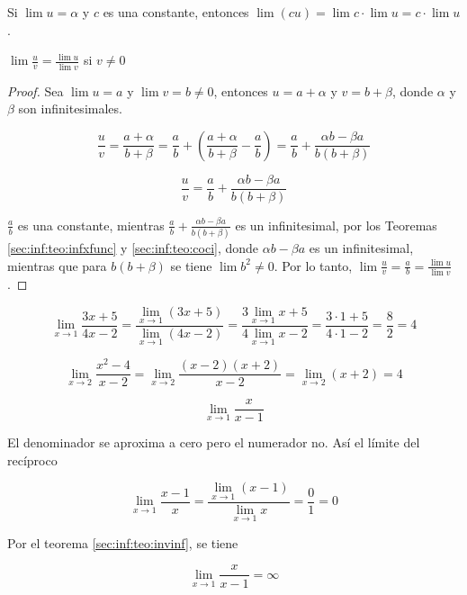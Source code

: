 \begin{corollary}
  Si $\lim u = \alpha$ y $c$ es una constante, entonces $\lim (cu) = \lim c \cdot \lim u = c \cdot \lim u$.
\end{corollary}


\begin{theorem}
  $\lim \frac {u}{v} = \frac {\lim u} {\lim v}$ si $v \ne 0$
\end{theorem}

\begin{proof}
  Sea $\lim u = a$ y $\lim v = b \ne 0$, entonces $u = a + \alpha$ y $v = b + \beta$, donde $\alpha$ y $\beta$ son infinitesimales.

  $$\frac{u}{v} = \frac {a + \alpha} {b + \beta} = \frac {a} {b} + \left( \frac {a + \alpha} {b + \beta} - \frac {a} {b} \right) = \frac {a} {b} + \frac {\alpha b - \beta a} {b (b + \beta)}$$

  $$\frac{u}{v} = \frac {a} {b} + \frac {\alpha b - \beta a} {b (b + \beta)}$$

  $\frac {a} {b}$ es una constante, mientras $\frac {a} {b} + \frac {\alpha b - \beta a} {b (b + \beta)}$ es un infinitesimal, por los Teoremas \ref{sec:inf:teo:infxfunc} y \ref{sec:inf:teo:coci}, donde $\alpha b - \beta a$ es un infinitesimal, mientras que para $b (b + \beta)$ se tiene $\lim b^2 \ne 0$. Por lo tanto, $\lim \frac{u} {v} = \frac {a} {b} = \frac {\lim u} {\lim v}$.
\end{proof}


\begin{example}
  \[ \lim_{x \to 1} \frac {3x + 5} {4x - 2} = \frac {\lim_{x \to 1} (3x + 5)} {\lim_{x \to 1} (4x - 2)} = \frac {3 \lim_{x \to 1} x + 5} {4 \lim_{x \to 1} x - 2} = \frac {3 \cdot 1 + 5} {4 \cdot 1 - 2} = \frac {8} {2} = 4\]
\end{example}


\begin{example}
  \[ \lim_{x \to 2} \frac {x^2 - 4} {x - 2} = \lim_{x \to 2} \frac {(x - 2) (x + 2)} {x - 2} = \lim_{x \to 2} (x + 2) = 4 \]
\end{example}


\begin{example}
  \[ \lim_{x \to 1} \frac {x} {x - 1} \]

  El denominador se aproxima a cero pero el numerador no. Así el límite del recíproco

  \[ \lim_{x \to 1} \frac {x - 1} {x} = \frac {\lim_{x \to 1} (x - 1)} {\lim_{x \to 1}  x} = \frac {0} {1} = 0 \]

  Por el teorema \ref{sec:inf:teo:invinf}, se tiene

  \[ \lim_{x \to 1} \frac {x} {x - 1} = \infty \]
\end{example}


